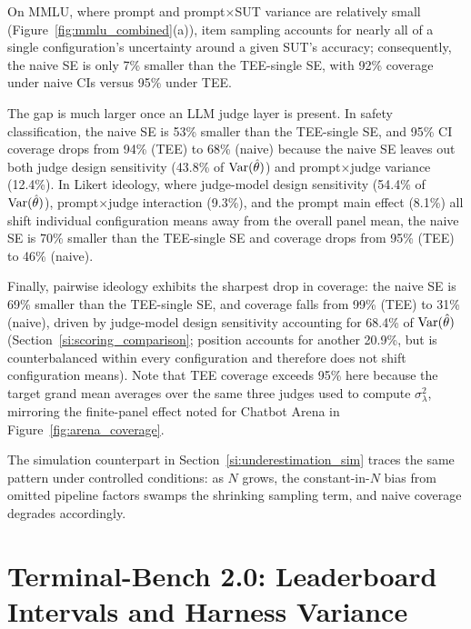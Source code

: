 On MMLU, where prompt and prompt$\times$SUT variance are relatively small (Figure~\ref{fig:mmlu_combined}(a)), item sampling accounts for nearly all of a single configuration's uncertainty around a given SUT's accuracy; consequently, the naive SE is only 7\% smaller than the TEE-single SE, with 92\% coverage under naive CIs versus 95\% under TEE.

The gap is much larger once an LLM judge layer is present. In safety classification, the naive SE is 53\% smaller than the TEE-single SE, and 95\% CI coverage drops from 94\% (TEE) to 68\% (naive) because the naive SE leaves out both judge design sensitivity (43.8\% of $\operatorname{Var}(\hat\theta)$) and prompt$\times$judge variance (12.4\%). In Likert ideology, where judge-model design sensitivity (54.4\% of $\operatorname{Var}(\hat\theta)$), prompt$\times$judge interaction (9.3\%), and the prompt main effect (8.1\%) all shift individual configuration means away from the overall panel mean, the naive SE is 70\% smaller than the TEE-single SE and coverage drops from 95\% (TEE) to 46\% (naive).

Finally, pairwise ideology exhibits the sharpest drop in coverage: the naive SE is 69\% smaller than the TEE-single SE, and coverage falls from 99\% (TEE) to 31\% (naive), driven by judge-model design sensitivity accounting for 68.4\% of $\operatorname{Var}(\hat\theta)$ (Section~\ref{si:scoring_comparison}; position accounts for another 20.9\%, but is counterbalanced within every configuration and therefore does not shift configuration means). Note that TEE coverage exceeds 95\% here because the target grand mean averages over the same three judges used to compute $\sigma^2_\lambda$, mirroring the finite-panel effect noted for Chatbot Arena in Figure~\ref{fig:arena_coverage}.

The simulation counterpart in Section~\ref{si:underestimation_sim} traces the same pattern under controlled conditions: as $N$ grows, the constant-in-$N$ bias from omitted pipeline factors swamps the shrinking sampling term, and naive coverage degrades accordingly.




\clearpage

\section{Terminal-Bench 2.0: Leaderboard Intervals and Harness Variance}
\label{si:tbench}

